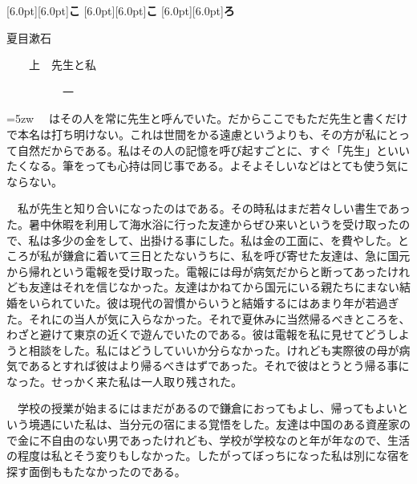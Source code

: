 \documentclass[a4j,onecolumn]{tarticle}
\begin{document}
\raisebox{0pt}[6.0pt][6.0pt]{\Huge\mcfamily\bfseries こ}
\raisebox{0pt}[6.0pt][6.0pt]{\Huge\mcfamily\bfseries こ}
\raisebox{0pt}[6.0pt][6.0pt]{\Huge\mcfamily\bfseries ろ}



\hfill 夏目漱石







\par{}\par{}



\par{}　　上　先生と私
\par{}\par{}　　　　　一
\par{}
{
  \leftskip=5zw
　はその人を常に先生と呼んでいた。\hbox{}だからここでもただ先生と書くだけで本名は打ち明けない。\hbox{}これは世間をかる遠慮というよりも、\hbox{}その方が私にとって自然だからである。\hbox{}私はその人の記憶を呼び起すごとに、\hbox{}すぐ「先生」といいたくなる。\hbox{}筆をっても心持は同じ事である。\hbox{}よそよそしいなどはとても使う気にならない。\hbox{}\par{}
　私が先生と知り合いになったのはである。\hbox{}その時私はまだ若々しい書生であった。\hbox{}暑中休暇を利用して海水浴に行った友達からぜひ来いというを受け取ったので、\hbox{}私は多少の金をして、\hbox{}出掛ける事にした。\hbox{}私は金の工面に、\hbox{}を費やした。\hbox{}ところが私が鎌倉に着いて三日とたないうちに、\hbox{}私を呼び寄せた友達は、\hbox{}急に国元から帰れという電報を受け取った。\hbox{}電報には母が病気だからと断ってあったけれども友達はそれを信じなかった。\hbox{}友達はかねてから国元にいる親たちにまない結婚をいられていた。\hbox{}彼は現代の習慣からいうと結婚するにはあまり年が若過ぎた。\hbox{}それにの当人が気に入らなかった。\hbox{}それで夏休みに当然帰るべきところを、\hbox{}わざと避けて東京の近くで遊んでいたのである。\hbox{}彼は電報を私に見せてどうしようと相談をした。\hbox{}私にはどうしていいか分らなかった。\hbox{}けれども実際彼の母が病気であるとすれば彼はより帰るべきはずであった。\hbox{}それで彼はとうとう帰る事になった。\hbox{}せっかく来た私は一人取り残された。\hbox{}\par{}
}
　学校の授業が始まるにはまだがあるので鎌倉におってもよし、\hbox{}帰ってもよいという境遇にいた私は、\hbox{}当分元の宿にまる覚悟をした。\hbox{}友達は中国のある資産家ので金に不自由のない男であったけれども、\hbox{}学校が学校なのと年が年なので、\hbox{}生活の程度は私とそう変りもしなかった。\hbox{}したがってぼっちになった私は別にな宿を探す面倒ももたなかったのである。\hbox{}\par{}
\end{document}
